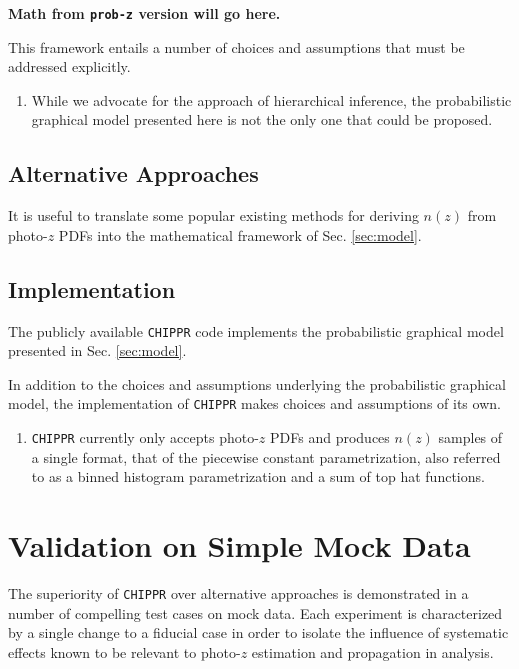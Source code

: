 \documentclass[iop]{emulateapj}
\newcommand{\chippr}{\texttt{CHIPPR} }
\begin{document}
\textbf{Math from \texttt{prob-z} version will go here.}

This framework entails a number of choices and assumptions that must be 
addressed explicitly.

\begin{enumerate}
	\item While we advocate for the approach of hierarchical inference, the 
probabilistic graphical model presented here is not the only one that could be 
proposed.
\end{enumerate}

\subsection{Alternative Approaches}
\label{sec:others}

It is useful to translate some popular existing methods for deriving $n(z)$ 
from photo-$z$ PDFs into the mathematical framework of Sec. \ref{sec:model}.

\subsection{Implementation}
\label{sec:implementation}

The publicly available \chippr code implements the probabilistic graphical 
model presented in Sec. \ref{sec:model}.  

In addition to the choices and assumptions underlying the probabilistic 
graphical model, the implementation of \chippr makes choices and assumptions of 
its own.

\begin{enumerate}
	\item \chippr currently only accepts photo-$z$ PDFs and produces $n(z)$ 
samples of a single format, that of the piecewise constant parametrization, 
also referred to as a binned histogram parametrization and a sum of top hat 
functions.
\end{enumerate}

\section{Validation on Simple Mock Data}
\label{sec:validation}

The superiority of \chippr over alternative approaches is demonstrated in a 
number of compelling test cases on mock data.  Each experiment is characterized 
by a single change to a fiducial case in order to isolate the influence of 
systematic effects known to be relevant to photo-$z$ estimation and propagation 
in analysis.  
\end{document}
